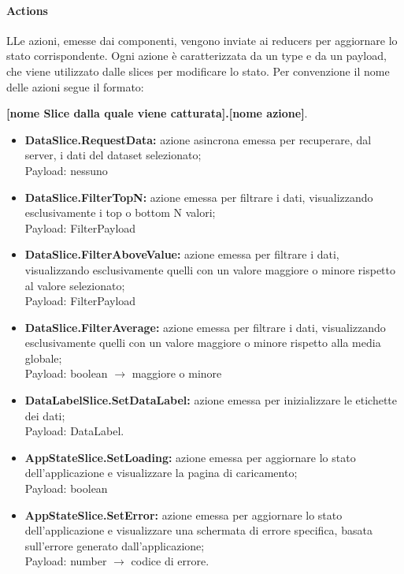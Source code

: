 \paragraph{Actions}
    LLe azioni, emesse dai componenti, vengono inviate ai reducers per aggiornare lo stato corrispondente.
    Ogni azione è caratterizzata da un type e da un payload, che viene utilizzato dalle slices per modificare lo stato.
    Per convenzione il nome delle azioni segue il formato: \\
    \begin{center}
        \textbf{[nome Slice dalla quale viene catturata].[nome azione]}.
    \end{center}
    \begin{itemize}
        \item \textbf{DataSlice.RequestData:} azione asincrona emessa per recuperare, dal server, i dati del dataset selezionato; \\ Payload: nessuno
        \item \textbf{DataSlice.FilterTopN:} azione emessa per filtrare i dati, visualizzando esclusivamente i top o bottom N valori; \\ Payload: FilterPayload
        \item \textbf{DataSlice.FilterAboveValue:} azione emessa per filtrare i dati, visualizzando esclusivamente quelli con un valore maggiore o minore rispetto al valore selezionato;\\ Payload: FilterPayload
        \item \textbf{DataSlice.FilterAverage:} azione emessa per filtrare i dati, visualizzando esclusivamente quelli con un valore maggiore o minore rispetto alla media globale; \\ Payload: boolean $\rightarrow$ maggiore o minore
        \item \textbf{DataLabelSlice.SetDataLabel:} azione emessa per inizializzare le etichette dei dati; \\ Payload: DataLabel.
        \item \textbf{AppStateSlice.SetLoading:} azione emessa per aggiornare lo stato dell'applicazione e visualizzare la pagina di caricamento; \\ Payload: boolean
        \item \textbf{AppStateSlice.SetError:} azione emessa per aggiornare lo stato dell'applicazione e visualizzare una schermata di errore specifica, basata sull'errore generato dall'applicazione; \\ Payload: number $\rightarrow$ codice di errore.

\end{itemize}
